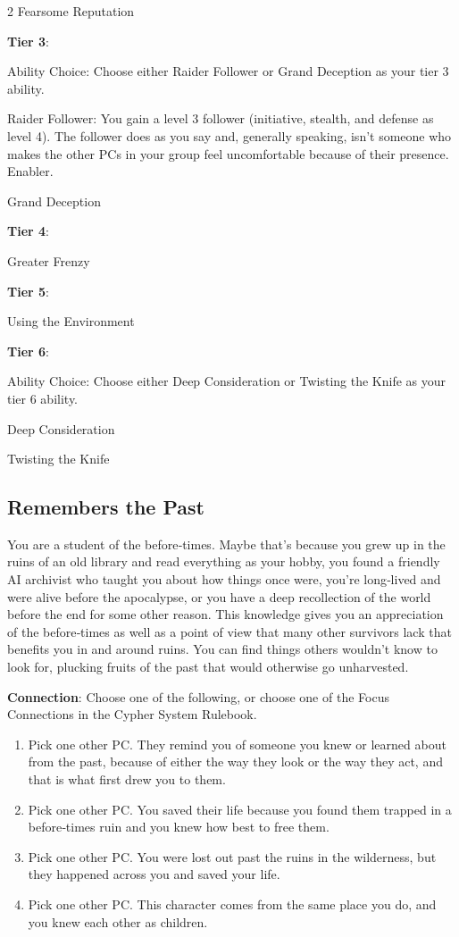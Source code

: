 \begin{multicols}{2}
Fearsome Reputation 

\textbf{Tier 3}:

Ability Choice: Choose either Raider Follower or Grand Deception as your tier 3 ability. 

Raider Follower: You gain a level 3 follower (initiative, stealth, and defense as level 4). The follower does as you say and, generally speaking, isn’t someone who makes the other PCs in your group feel uncomfortable because of their
presence. Enabler.

Grand Deception 

\textbf{Tier 4}:

Greater Frenzy

\textbf{Tier 5}:

Using the Environment 

\textbf{Tier 6}:

Ability Choice: Choose either Deep Consideration or Twisting the Knife as your tier 6 ability. 

Deep Consideration 

Twisting the Knife

\subsection{Remembers the Past}

You are a student of the before‑times. Maybe that’s because you grew up in the ruins of an old library and read everything as your hobby, you found a friendly AI archivist who taught you about how things once were, you’re long‑lived and were alive before the apocalypse, or you have a deep recollection of the world before the end for some other reason. This knowledge gives you an appreciation of the before‑times as well as a point of view that many other survivors lack that benefits you in and around ruins. You can find things others wouldn’t know to look for, plucking fruits of the past that would otherwise go unharvested.

\textbf{Connection}: Choose one of the following, or choose one of the Focus Connections in the Cypher System Rulebook.
\begin{enumerate}
\item Pick one other PC. They remind you of someone you knew or learned about from the past, because of either the way they look or the way they act, and that is what first drew you to them.
\item Pick one other PC. You saved their life because you found them trapped in a before‑times ruin and you knew how best to free them.
\item Pick one other PC. You were lost out past the ruins in the wilderness, but they happened across you and saved your life.
\item Pick one other PC. This character comes from the same place you do, and you knew each other as children.
\end{enumerate}


\end{multicols}
